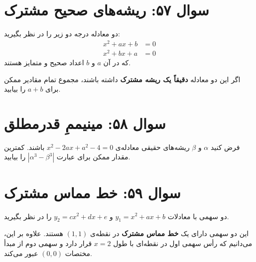 \documentclass[12pt]{article}
\begin{document}
	\vspace{1cm}
	\hrulefill
	\vspace{1cm}
	
	\section*{سوال ۵۷: ریشه‌های صحیح مشترک}
	دو معادله درجه دو زیر را در نظر بگیرید:
	\begin{align*}
		x^2 + ax + b &= 0 \\
		x^2 + bx + a &= 0
	\end{align*}
	که در آن \(a\) و \(b\) اعداد صحیح و متمایز هستند.
	\vspace{0.5cm}
	
	اگر این دو معادله \textbf{دقیقاً یک ریشه مشترک} داشته باشند، مجموع تمام مقادیر ممکن برای \(a+b\) را بیابید.
	
	\vspace{1cm}
	\hrulefill
	\vspace{1cm}
	
	\section*{سوال ۵۸: مینیممِ قدرمطلق}
	فرض کنید \(\alpha\) و \(\beta\) ریشه‌های حقیقی معادله‌ی \( x^2 - 2ax + a^2 - 4 = 0 \) باشند. کمترین مقدار ممکن برای عبارت \( |\alpha^3 - \beta^3| \) را بیابید.
	
	\vspace{1cm}
	\hrulefill
	\vspace{1cm}
	
	\section*{سوال ۵۹: خط مماس مشترک }
	دو سهمی با معادلات \( y_1 = x^2 + ax + b \) و \( y_2 = cx^2 + dx + e \) را در نظر بگیرید.
	\vspace{0.5cm}
	
	این دو سهمی دارای یک \textbf{خط مماس مشترک} در نقطه‌ی \( (1, 1) \) هستند. علاوه بر این، می‌دانیم که رأس سهمی اول در نقطه‌ای با طول \(x=2\) قرار دارد و سهمی دوم از مبدأ مختصات \( (0,0) \) عبور می‌کند.
	\vspace{0.5cm}
	
\end{document}
